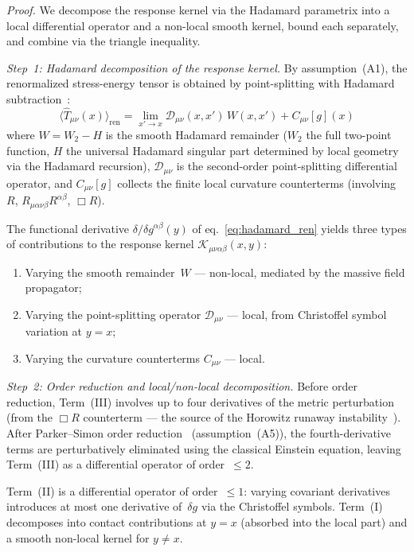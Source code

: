 \documentclass[12pt,a4paper]{article}
\begin{document}
\noindent\emph{Proof.} We decompose the response kernel via the Hadamard
parametrix into a local differential operator and a non-local smooth kernel,
bound each separately, and combine via the triangle inequality.

\smallskip\noindent\textit{Step~1: Hadamard decomposition of the response kernel.}
By assumption~(A1), the renormalized stress-energy tensor is obtained by
point-splitting with Hadamard subtraction~\cite{hollands_wald_wick}:
\begin{equation}
\langle\hat{T}_{\mu\nu}(x)\rangle_{\mathrm{ren}}
= \lim_{x'\to x}\mathcal{D}_{\mu\nu}(x,x')\,W(x,x') + C_{\mu\nu}[g](x)
\label{eq:hadamard_ren}
\end{equation}
where $W = W_2 - H$ is the smooth Hadamard remainder ($W_2$ the full
two-point function, $H$ the universal Hadamard singular part determined by
local geometry via the Hadamard recursion), $\mathcal{D}_{\mu\nu}$ is the
second-order point-splitting differential operator, and $C_{\mu\nu}[g]$ collects
the finite local curvature counterterms (involving $R$,
$R_{\mu\alpha\nu\beta}R^{\alpha\beta}$, $\Box R$).

The functional derivative $\delta/\delta g^{\alpha\beta}(y)$ of
eq.~\eqref{eq:hadamard_ren} yields three types of contributions to the
response kernel $\mathcal{K}_{\mu\nu\alpha\beta}(x,y)$:
\begin{enumerate}
\item[(I)] Varying the smooth remainder~$W$ --- non-local, mediated by the
massive field propagator;
\item[(II)] Varying the point-splitting operator $\mathcal{D}_{\mu\nu}$ ---
local, from Christoffel symbol variation at $y=x$;
\item[(III)] Varying the curvature counterterms $C_{\mu\nu}$ --- local.
\end{enumerate}

\smallskip\noindent\textit{Step~2: Order reduction and local/non-local decomposition.}
Before order reduction, Term~(III) involves up to four derivatives of the
metric perturbation (from the $\Box R$ counterterm --- the source of the
Horowitz runaway instability~\cite{horowitz}). After Parker--Simon order
reduction~\cite{parker_simon} (assumption~(A5)), the fourth-derivative
terms are perturbatively eliminated using the classical Einstein equation,
leaving Term~(III) as a differential operator of order~$\leq 2$.

Term~(II) is a differential operator of order~$\leq 1$: varying
covariant derivatives introduces at most one derivative of~$\delta g$
via the Christoffel symbols. Term~(I) decomposes into contact
contributions at $y = x$ (absorbed into the local part) and a smooth
non-local kernel for $y\neq x$.
\end{document}

